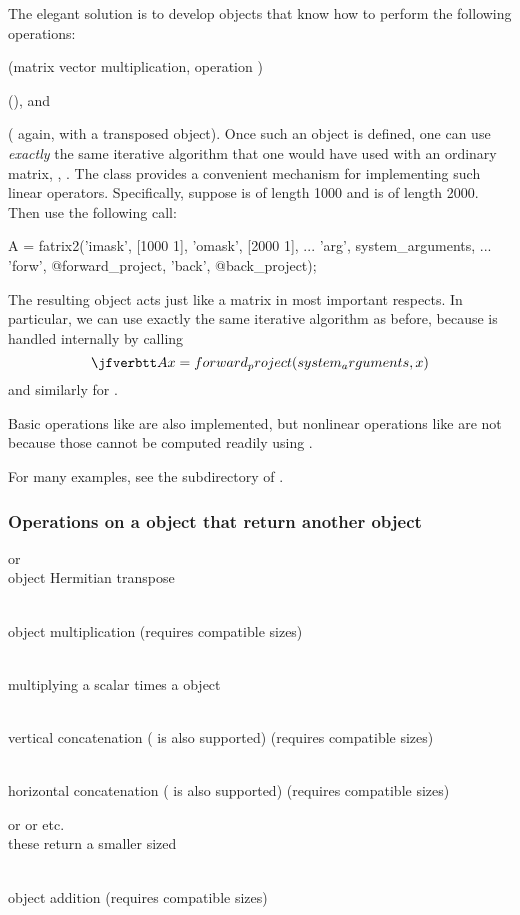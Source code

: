 The elegant solution
is to develop \matlab objects
that know how to perform
the following operations:
\blist
\item
{}
(matrix vector multiplication,
operation )
\item
{}
(), and
\item
{}
( again,
with a transposed object).
\elist
Once such an object is
defined,
one can use \emph{exactly}
the same iterative algorithm
that one would have used
with an ordinary matrix,
\eg,
.
%
The \fatrixx class
provides a convenient mechanism
for implementing
such linear operators.
%
Specifically,
suppose \x is of length 1000
and \y is of length 2000.
Then use the following call:
\begin{verbatimtab}
A = fatrix2('imask', [1000 1], 'omask', [2000 1], ...
	'arg', system_arguments, ...
	'forw', @forward_project, 'back', @back_project);
\end{verbatimtab}
The resulting \fatrixx object 
acts just like a matrix
in most important respects.
In particular,
we can use exactly the same iterative algorithm
 as before,
because
is handled internally
by calling
\[
\ty{
Ax = forward_project(system_arguments, x)
}
\]
and similarly for
.

Basic operations
like 
are also implemented,
but nonlinear operations
like 
are not
because those cannot be computed readily
using . 

For many examples, see
the  subdirectory of \irt.

\subsubsection
{
Operations on a \fatrixx object
that return another \fatrixx object
}

\blist
\item
{} or 
\\
\fatrixx object Hermitian transpose
\item
{}
\\
\fatrixx object multiplication
(requires compatible sizes)
\item
{}
\\
multiplying a scalar times a \fatrixx object
\item
{}
\\
vertical concatenation ( is also supported)
(requires compatible sizes)
\item
{}
\\
horizontal concatenation ( is also supported) %
(requires compatible sizes)
\item
{} or  or  etc.
\\
these return a smaller sized \fatrixx
\item
{}
\\
\fatrixx object addition
(requires compatible sizes)
\elist


